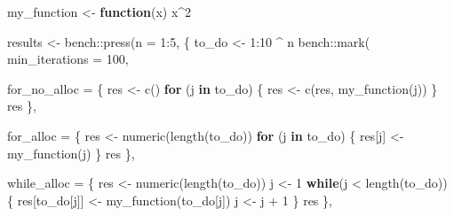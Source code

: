 \documentclass[
]{book}
\newenvironment{Shaded}{\begin{snugshade}}{\end{snugshade}}
\newcommand{\AttributeTok}[1]{\textcolor[rgb]{0.77,0.63,0.00}{#1}}
\newcommand{\ControlFlowTok}[1]{\textcolor[rgb]{0.13,0.29,0.53}{\textbf{#1}}}
\newcommand{\DecValTok}[1]{\textcolor[rgb]{0.00,0.00,0.81}{#1}}
\newcommand{\FunctionTok}[1]{\textcolor[rgb]{0.00,0.00,0.00}{#1}}
\newcommand{\NormalTok}[1]{#1}
\newcommand{\OtherTok}[1]{\textcolor[rgb]{0.56,0.35,0.01}{#1}}
\newcommand{\SpecialCharTok}[1]{\textcolor[rgb]{0.00,0.00,0.00}{#1}}
\begin{document}
\begin{Shaded}
\begin{Highlighting}[]
\NormalTok{my\_function }\OtherTok{\textless{}{-}} \ControlFlowTok{function}\NormalTok{(x) x}\SpecialCharTok{\^{}}\DecValTok{2}


\NormalTok{results }\OtherTok{\textless{}{-}}\NormalTok{ bench}\SpecialCharTok{::}\FunctionTok{press}\NormalTok{(}\AttributeTok{n =} \DecValTok{1}\SpecialCharTok{:}\DecValTok{5}\NormalTok{,}
\NormalTok{                        \{}
\NormalTok{                          to\_do }\OtherTok{\textless{}{-}} \DecValTok{1}\SpecialCharTok{:}\DecValTok{10} \SpecialCharTok{\^{}}\NormalTok{ n}
\NormalTok{                          bench}\SpecialCharTok{::}\FunctionTok{mark}\NormalTok{(}
                            \AttributeTok{min\_iterations =} \DecValTok{100}\NormalTok{,}
                            
                            \AttributeTok{for\_no\_alloc =}\NormalTok{ \{}
\NormalTok{                              res }\OtherTok{\textless{}{-}} \FunctionTok{c}\NormalTok{()}
                              \ControlFlowTok{for}\NormalTok{ (j }\ControlFlowTok{in}\NormalTok{ to\_do) \{}
\NormalTok{                                res }\OtherTok{\textless{}{-}} \FunctionTok{c}\NormalTok{(res, }\FunctionTok{my\_function}\NormalTok{(j))}
\NormalTok{                              \}}
\NormalTok{                              res}
\NormalTok{                            \},}
                            
                            \AttributeTok{for\_alloc =}\NormalTok{ \{}
\NormalTok{                              res }\OtherTok{\textless{}{-}} \FunctionTok{numeric}\NormalTok{(}\FunctionTok{length}\NormalTok{(to\_do))}
                              \ControlFlowTok{for}\NormalTok{ (j }\ControlFlowTok{in}\NormalTok{ to\_do) \{}
\NormalTok{                                res[j] }\OtherTok{\textless{}{-}} \FunctionTok{my\_function}\NormalTok{(j)}
\NormalTok{                              \}}
\NormalTok{                              res}
\NormalTok{                            \},}
                            
                            \AttributeTok{while\_alloc =}\NormalTok{ \{}
\NormalTok{                              res }\OtherTok{\textless{}{-}} \FunctionTok{numeric}\NormalTok{(}\FunctionTok{length}\NormalTok{(to\_do))}
\NormalTok{                              j }\OtherTok{\textless{}{-}} \DecValTok{1}
                              \ControlFlowTok{while}\NormalTok{(j }\SpecialCharTok{\textless{}} \FunctionTok{length}\NormalTok{(to\_do)) \{}
\NormalTok{                                res[to\_do[j]] }\OtherTok{\textless{}{-}} \FunctionTok{my\_function}\NormalTok{(to\_do[j])}
\NormalTok{                                j }\OtherTok{\textless{}{-}}\NormalTok{ j }\SpecialCharTok{+} \DecValTok{1}
\NormalTok{                              \}}
\NormalTok{                              res}
\NormalTok{                            \},}
                            

\end{Highlighting}
\end{Shaded}
\end{document}
